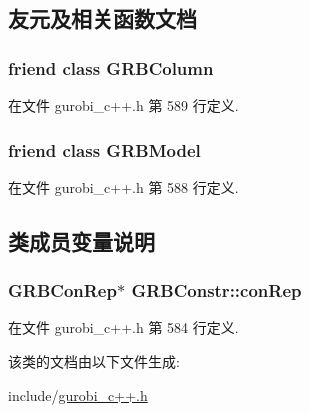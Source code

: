 \subsection{友元及相关函数文档}
\subsubsection[{\texorpdfstring{G\+R\+B\+Column}{GRBColumn}}]{\setlength{\rightskip}{0pt plus 5cm}friend class {\bf G\+R\+B\+Column}\hspace{0.3cm}{\ttfamily [friend]}}\hypertarget{classGRBConstr_a6452fbce8b7eb06314bb49def647649e}{}\label{classGRBConstr_a6452fbce8b7eb06314bb49def647649e}


在文件 gurobi\+\_\+c++.\+h 第 589 行定义.

\subsubsection[{\texorpdfstring{G\+R\+B\+Model}{GRBModel}}]{\setlength{\rightskip}{0pt plus 5cm}friend class {\bf G\+R\+B\+Model}\hspace{0.3cm}{\ttfamily [friend]}}\hypertarget{classGRBConstr_a43690ac42cca6dade14d7fde97306d59}{}\label{classGRBConstr_a43690ac42cca6dade14d7fde97306d59}


在文件 gurobi\+\_\+c++.\+h 第 588 行定义.



\subsection{类成员变量说明}
\subsubsection[{\texorpdfstring{con\+Rep}{conRep}}]{\setlength{\rightskip}{0pt plus 5cm}G\+R\+B\+Con\+Rep$\ast$ G\+R\+B\+Constr\+::con\+Rep\hspace{0.3cm}{\ttfamily [private]}}\hypertarget{classGRBConstr_a8a09f73543ba2fccfbe845696380ec2d}{}\label{classGRBConstr_a8a09f73543ba2fccfbe845696380ec2d}


在文件 gurobi\+\_\+c++.\+h 第 584 行定义.



该类的文档由以下文件生成\+:\begin{DoxyCompactItemize}
\item 
include/\hyperlink{gurobi__c_09_09_8h}{gurobi\+\_\+c++.\+h}\end{DoxyCompactItemize}
